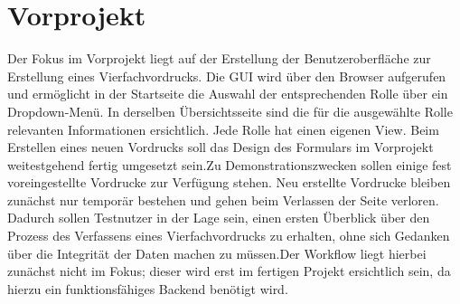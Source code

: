 \section{Vorprojekt}
Der Fokus im Vorprojekt liegt auf der Erstellung der Benutzeroberfläche zur Erstellung eines Vierfachvordrucks. 
Die GUI wird über den Browser aufgerufen und ermöglicht in der Startseite die Auswahl der entsprechenden Rolle über 
ein Dropdown-Menü. In derselben Übersichtsseite sind die für die ausgewählte Rolle relevanten Informationen ersichtlich. 
Jede Rolle hat einen eigenen View. Beim Erstellen eines neuen Vordrucks soll das Design des Formulars im Vorprojekt 
weitestgehend fertig umgesetzt sein.Zu Demonstrationszwecken sollen einige fest voreingestellte Vordrucke zur Verfügung stehen. Neu erstellte Vordrucke bleiben zunächst nur temporär bestehen und gehen beim Verlassen der Seite verloren. Dadurch sollen Testnutzer in der Lage sein, einen ersten Überblick über den Prozess des Verfassens eines Vierfachvordrucks zu erhalten,
ohne sich Gedanken über die Integrität der Daten machen zu müssen.Der Workflow liegt hierbei zunächst nicht im Fokus; dieser wird erst im fertigen Projekt ersichtlich sein, da hierzu
ein funktionsfähiges Backend benötigt wird.

